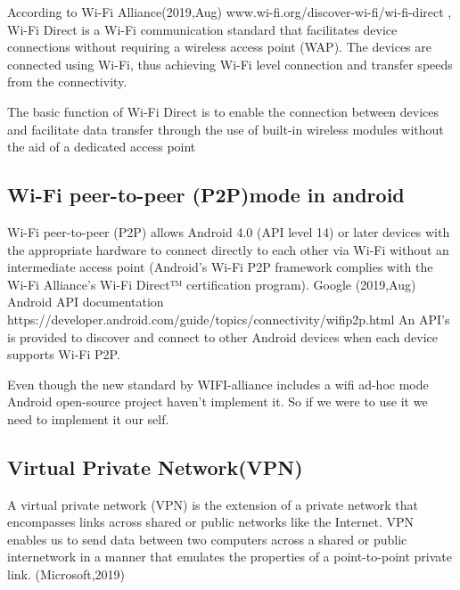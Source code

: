 \vspace{12pt}
According to Wi-Fi Alliance(2019,Aug) www.wi-fi.org/discover-wi-fi/wi-fi-direct \cite{WiFiDirect-by-wifi-aliance}, Wi-Fi Direct is a Wi-Fi communication standard that facilitates device connections without requiring a wireless access point (WAP). The devices are connected using Wi-Fi, thus achieving Wi-Fi level connection and transfer speeds from the connectivity.

\vspace{12pt}
The basic function of Wi-Fi Direct is to enable the connection between devices and facilitate data transfer through the use of built-in wireless modules without the aid of a dedicated access point

\vspace{12pt}

\subsection{Wi-Fi peer-to-peer (P2P)mode in android}
\vspace{12pt}



Wi-Fi peer-to-peer (P2P) allows Android 4.0 (API level 14) or later devices with the appropriate hardware to connect directly to each other via Wi-Fi without an intermediate access point (Android's Wi-Fi P2P framework complies with the Wi-Fi Alliance's Wi-Fi Direct™ certification program). Google (2019,Aug) Android API documentation https://developer.android.com/guide/topics/connectivity/wifip2p.html\cite{androd-wifi-direct} An API’s is provided to discover and connect to other Android devices when each device supports Wi-Fi P2P.

\vspace{12pt}
	Even though the new standard by WIFI-alliance includes a  wifi ad-hoc mode Android open-source \cite{WiFiDirect-by-wifi-aliance} project haven't implement it. So if we were to use it we need to implement it our self.





\vspace{12pt}

\subsection{Virtual Private Network(VPN)}

A virtual private network (VPN) is the extension of a private network that encompasses links across shared or public networks like the Internet. VPN enables us to send data between two computers across a shared or public internetwork in a manner that emulates the properties of a point-to-point private link. (Microsoft,2019)\cite{vpn}




